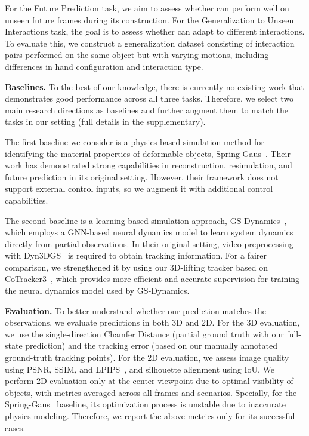 For the Future Prediction task, we aim to assess whether \ourabbr can perform well on unseen future frames during its construction.  
For the Generalization to Unseen Interactions task, the goal is to assess whether \ourabbr can adapt to different interactions. To evaluate this, we construct a generalization dataset consisting of interaction pairs performed on the same object but with varying motions, including differences in hand configuration and interaction type.


\textbf{Baselines.}
To the best of our knowledge, there is currently no existing work that demonstrates good performance across all three tasks. Therefore, we select two main research directions as baselines and further augment them to match the tasks in our setting (full details in the supplementary).

The first baseline we consider is a physics-based simulation method for identifying the material properties of deformable objects, Spring-Gaus~\cite{zhong2024reconstruction}. Their work has demonstrated strong capabilities in reconstruction, resimulation, and future prediction in its original setting. However, their framework does not support external control inputs, so we augment it with additional control capabilities.

The second baseline is a learning-based simulation approach, GS-Dynamics~\cite{zhang2024dynamic}, which employs a GNN-based neural dynamics model to learn system dynamics directly from partial observations. In their original setting, video preprocessing with Dyn3DGS~\cite{luiten2024dynamic} is required to obtain tracking information. For a fairer comparison, we strengthened it by using our 3D-lifting tracker based on CoTracker3~\cite{karaev2024cotracker3}, which provides more efficient and accurate supervision for training the neural dynamics model used by GS-Dynamics.


\textbf{Evaluation.}
To better understand whether our prediction matches the observations, we evaluate predictions in both 3D and 2D. For the 3D evaluation, we use the single-direction Chamfer Distance (partial ground truth with our full-state prediction) and the tracking error (based on our manually annotated ground-truth tracking points). For the 2D evaluation, we assess image quality using PSNR, SSIM, and LPIPS~\cite{zhang2018perceptual}, and silhouette alignment using IoU. We perform 2D evaluation only at the center viewpoint due to optimal visibility of objects, with metrics averaged across all frames and scenarios. Specially, for the Spring-Gaus~\cite{zhong2024reconstruction} baseline, its optimization process is unstable due to inaccurate physics modeling. Therefore, we report the above metrics only for its successful cases.

